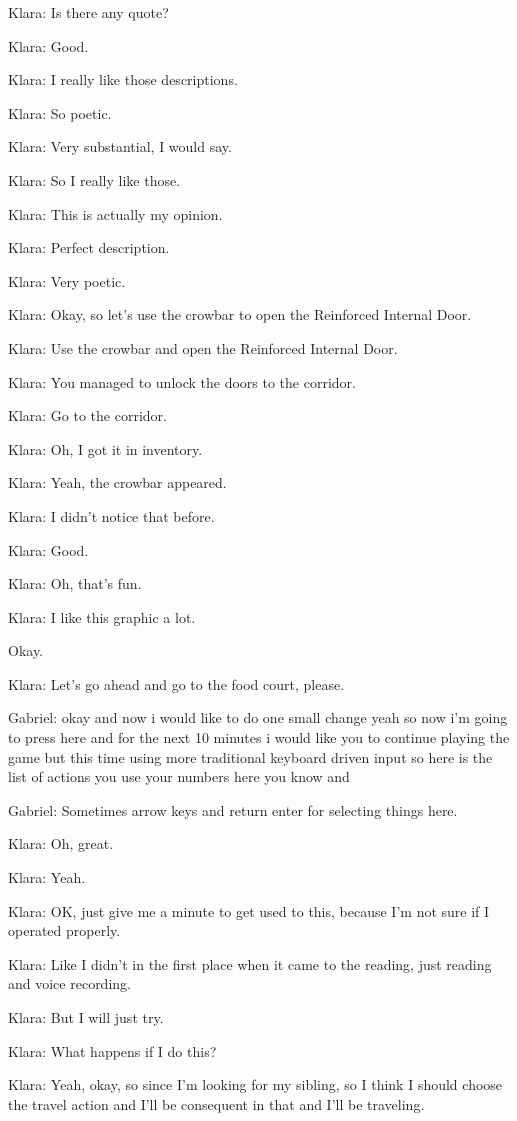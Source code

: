Klara: Is there any quote?

Klara: Good.

Klara: I really like those descriptions.

Klara: So poetic.

Klara: Very substantial, I would say.

Klara: So I really like those.

Klara: This is actually my opinion.

Klara: Perfect description.

Klara: Very poetic.

Klara: Okay, so let's use the crowbar to open the Reinforced Internal Door.

Klara: Use the crowbar and open the Reinforced Internal Door.

Klara: You managed to unlock the doors to the corridor.

Klara: Go to the corridor.

Klara: Oh, I got it in inventory.

Klara: Yeah, the crowbar appeared.

Klara: I didn't notice that before.

Klara: Good.

Klara: Oh, that's fun.

Klara: I like this graphic a lot.

Okay.

Klara: Let's go ahead and go to the food court, please.

Gabriel: okay and now i would like to do one small change yeah so now i'm going to press here and for the next 10 minutes i would like you to continue playing the game but this time using more traditional keyboard driven input so here is the list of actions you use your numbers here you know and

Gabriel: Sometimes arrow keys and return enter for selecting things here.

Klara: Oh, great.

Klara: Yeah.

Klara: OK, just give me a minute to get used to this, because I'm not sure if I operated properly.

Klara: Like I didn't in the first place when it came to the reading, just reading and voice recording.

Klara: But I will just try.

Klara: What happens if I do this?

Klara: Yeah, okay, so since I'm looking for my sibling, so I think I should choose the travel action and I'll be consequent in that and I'll be traveling.

